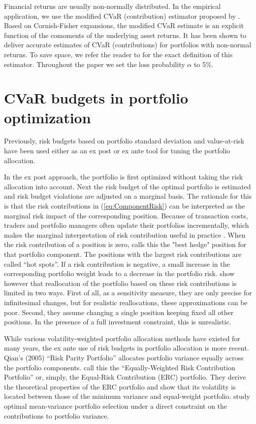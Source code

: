 \documentclass[12pt,a4paper]{article}
\begin{document}
Financial returns are usually non-normally distributed. In the empirical application, we use the modified CVaR (contribution) estimator proposed by \citet{Boudt2007}. Based on Cornish-Fisher expansions, the modified CVaR estimate is an explicit function of the comoments of the underlying asset returns. It has been shown to deliver accurate estimates of CVaR (contributions) for portfolios with non-normal returns. To save space, we refer the reader to \citet{Boudt2007} for the exact definition of this estimator.  Throughout the paper we set the loss probability $\alpha$ to 5\%.

\section{CVaR budgets in portfolio optimization \label{sec:PortfolioOptimization}}


Previously, risk budgets based on portfolio standard deviation and value-at-risk have been used either as an ex post or ex ante tool for tuning the portfolio allocation.

In the ex post approach, the portfolio is first optimized without taking the risk allocation into account. Next the risk budget of the optimal portfolio is estimated and risk budget violations are adjusted on a marginal basis. The rationale for this is that the risk contributions in (\ref{eq:ComponentRisk}) can be interpreted as the marginal risk impact of the corresponding position. Because of transaction costs, traders and portfolio managers often update their portfolios incrementally, which makes the marginal interpretation of risk contribution useful in practice \citep{Litterman1996, Stoyanov2009}. When the risk contribution of a position is zero, \citet{Litterman1996} calls this the "best hedge" position for that portfolio component. The positions with the largest risk contributions are called ``hot spots''. If a risk contribution is negative, a small increase in the corresponding portfolio weight leads to a decrease in the portfolio risk.  \citet{Keel2010} show however that reallocation of the portfolio based on these risk contributions is limited in two ways. First of all, as a sensitivity measure, they are only precise for infinitesimal changes, but for realistic reallocations, these approximations can be poor. Second, they assume changing a single position keeping fixed all other positions. In the presence of a full investment constraint, this is unrealistic.


While various volatility-weighted portfolio allocation methods have existed for many years, the ex ante use of risk budgets in portfolio allocation is more recent. \nocite{Qian2005} Qian's (2005) ``Risk Parity Portfolio'' allocates portfolio variance equally across the portfolio components. \citet{Maillard2010} call this the ``Equally-Weighted Risk Contribution Portfolio'' or, simply, the Equal-Risk Contribution (ERC) portfolio. They derive the theoretical properties of the ERC portfolio and show that its volatility is located between those of the minimum variance and equal-weight portfolio. \citet{Zhu2010} study optimal mean-variance portfolio selection under a direct constraint on the contributions to portfolio variance.
\end{document}
